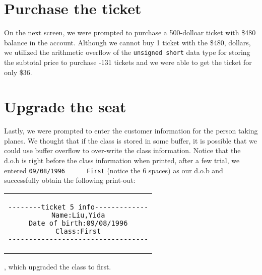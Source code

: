 \documentclass[11pt]{article}
\begin{document}
\section{Purchase the ticket}

On the next screen, we were prompted to purchase a 500-dolloar ticket with \$480 balance in the account. Although we cannot buy 1 ticket with the \$480, dollars, we utilized the arithmetic overflow of the \lstinline{unsigned short} data type for storing the subtotal price to purchase -131 tickets and we were able to get the ticket for only \$36.

\section{Upgrade the seat}

Lastly, we were prompted to enter the customer information for the person taking planes. We thought that if the class is stored in some buffer, it is possible that we could use buffer overflow to over-write the class information. Notice that the d.o.b is right before the class information when printed, after a few trial, we entered \lstinline{09/08/1996      First} (notice the 6 spaces) as our d.o.b and successfully obtain the following print-out:
\begin{center}
\begin{tabular}{c}
\begin{lstlisting}
--------ticket 5 info-------------
Name:Liu,Yida
Date of birth:09/08/1996
Class:First
----------------------------------
\end{lstlisting}
\end{tabular}
\end{center}
, which upgraded the class to first.
\end{document}

